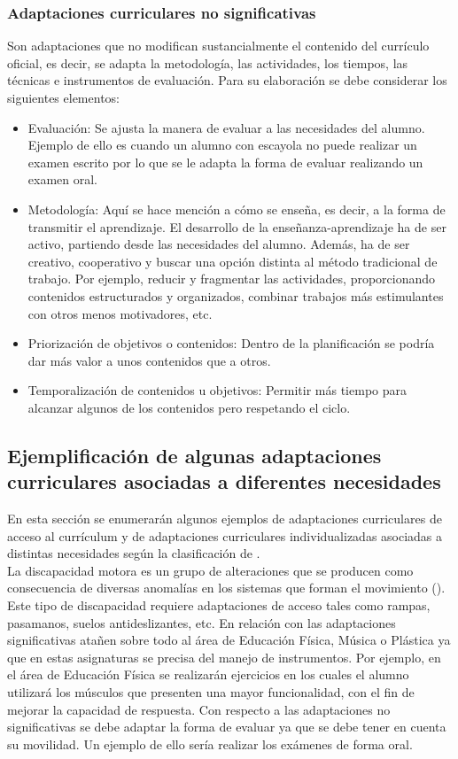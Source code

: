 \subsubsection{Adaptaciones curriculares no significativas}
Son adaptaciones que no modifican sustancialmente el contenido del currículo oficial, es decir, se adapta la metodología, las actividades, los tiempos, las técnicas e instrumentos de evaluación. Para su elaboración se debe considerar los siguientes elementos:
\begin{itemize}
    \item Evaluación: Se ajusta la manera de evaluar a las necesidades del alumno. Ejemplo de ello es cuando un alumno con escayola no puede realizar un examen escrito por lo que se le adapta la forma de evaluar realizando un examen oral.
    \item Metodología: Aquí se hace mención a cómo se enseña, es decir, a la forma de transmitir el aprendizaje. El desarrollo de la enseñanza-aprendizaje ha de ser activo, partiendo desde las necesidades del alumno. Además, ha de ser creativo, cooperativo y buscar una opción distinta al método tradicional de trabajo. Por ejemplo, reducir y fragmentar las actividades, proporcionando contenidos estructurados y organizados, combinar trabajos más estimulantes con otros menos motivadores, etc.
    \item Priorización de objetivos o contenidos: Dentro de la planificación se podría dar más valor a unos contenidos que a otros.
    \item Temporalización de contenidos u objetivos: Permitir más tiempo para alcanzar algunos de los contenidos pero respetando el ciclo.
\end{itemize}

\subsection{Ejemplificación de algunas adaptaciones curriculares asociadas a diferentes necesidades }

En esta sección se enumerarán algunos ejemplos de adaptaciones curriculares de acceso al currículum y de adaptaciones curriculares individualizadas asociadas a distintas necesidades según la clasificación de \citep*{adaptacionUNED}.
\\

La discapacidad motora es un grupo de alteraciones que se producen como consecuencia de diversas anomalías en los sistemas que forman el movimiento (\citeauthor{disMotora}). Este tipo de discapacidad requiere  adaptaciones de acceso tales como rampas, pasamanos, suelos antideslizantes, etc. En relación con las adaptaciones significativas atañen sobre todo al área de Educación Física, Música o Plástica ya que en estas asignaturas se precisa del manejo de instrumentos. Por ejemplo, en el área de Educación Física se realizarán ejercicios en los cuales el alumno utilizará los músculos que presenten una mayor funcionalidad, con el fin de mejorar la capacidad de respuesta. Con respecto a las adaptaciones no significativas se debe adaptar la forma de evaluar ya que se debe tener en cuenta su movilidad. Un ejemplo de ello sería realizar los exámenes de forma oral.
\\

